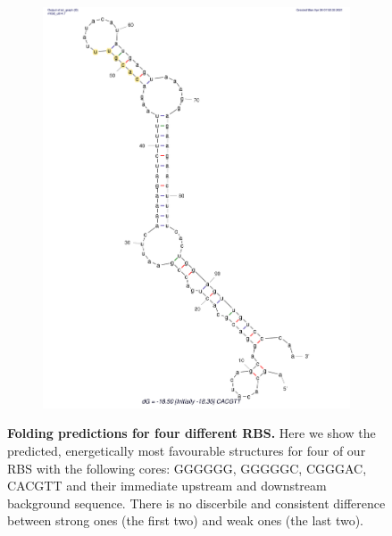 \documentclass{scrartcl}[2013/05/29]%
\begin{document}
\begin{figure}[!ht]
\begin{subfigure}[b]{0.49\textwidth}
        \includegraphics[scale=0.25]{plots/Supplementary/Structure_CACGTT.pdf}
        \label{fig:CACGTT}
    \end{subfigure}
       \caption{\textbf{Folding predictions for four different RBS.} Here we show the predicted, energetically most favourable structures for four of our RBS with the following cores: GGGGGG, GGGGGC, CGGGAC, CACGTT and their immediate upstream and downstream background sequence. There is no discerbile and consistent difference between strong ones (the first two) and weak ones (the last two).}
       \label{fig:structures}
\end{figure}
\end{document}
